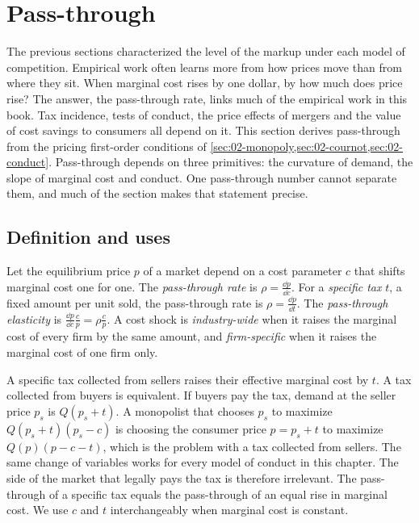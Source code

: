 \section{Pass-through}\label{sec:02-passthrough}

The previous sections characterized the level of the markup under each model of competition. Empirical work often
learns more from how prices move than from where they sit. When marginal cost rises by one dollar, by how much does
price rise? The answer, the pass-through rate, links
much of the empirical work in this book. Tax incidence, tests of conduct, the price effects of mergers and the
value of cost savings to consumers all depend on it. This section derives pass-through from the pricing
first-order conditions of \cref{sec:02-monopoly,sec:02-cournot,sec:02-conduct}. Pass-through depends on three
primitives: the curvature of demand, the slope of marginal cost and conduct. One pass-through number cannot
separate them, and much of the section makes that statement precise.

\subsection{Definition and uses}\label{sec:02-pt-uses}

\begin{definition}\label{def:02-passthrough}
Let the equilibrium price $p$ of a market depend on a cost parameter $c$ that shifts marginal cost one for one.
The \emph{pass-through rate} is $\rho = \frac{\dd p}{\dd c}$. For a \emph{specific tax} $t$, a fixed amount per unit
sold, the pass-through rate is $\rho = \frac{\dd p}{\dd t}$. The \emph{pass-through elasticity} is
$\frac{\dd p}{\dd c}\frac{c}{p} = \rho\frac{c}{p}$. A cost shock is \emph{industry-wide} when it raises the marginal
cost of every firm by the same amount, and \emph{firm-specific} when it raises the marginal cost of one firm
only.
\end{definition}

A specific tax collected from sellers raises their effective marginal cost by $t$. A tax collected from buyers
is equivalent. If buyers pay the tax, demand at the seller price $p_s$ is $Q(p_s + t)$. A monopolist that
chooses $p_s$ to maximize $Q(p_s + t)(p_s - c)$ is choosing the consumer price $p = p_s + t$ to maximize
$Q(p)(p - c - t)$, which is the problem with a tax collected from sellers. The same change of variables works
for every model of conduct in this chapter. The side of the market that legally pays the tax is therefore
irrelevant. The pass-through of a specific tax equals the pass-through of an equal rise in marginal cost.
We use $c$ and $t$ interchangeably when marginal cost is constant.

